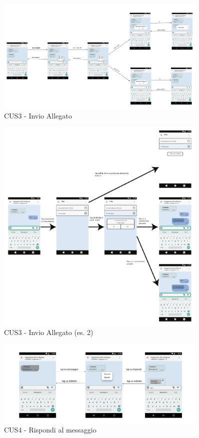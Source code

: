 \begin{figure}
	\centering
	\includegraphics[width=0.9\textwidth]{imgs/gruppo6/activities/act_cus3_invia_allegato.pdf}
	\caption{CUS3 - Invio Allegato}
	\label{fig:cus3-1}
\end{figure}

\begin{figure}
	\centering
	\includegraphics[width=0.9\textwidth]{imgs/gruppo6/activities/act_cus3_invio_allegato2.pdf}
	\caption{CUS3 - Invio Allegato (es. 2)}
	\label{fig:cus3-2}
\end{figure}

\begin{figure}
	\centering
	\includegraphics[width=0.9\textwidth]{imgs/gruppo6/activities/act_cus4_rispondi_singolo_messaggio.pdf}
	\caption{CUS4 - Rispondi al messaggio}
	\label{fig:cus4}
\end{figure}

